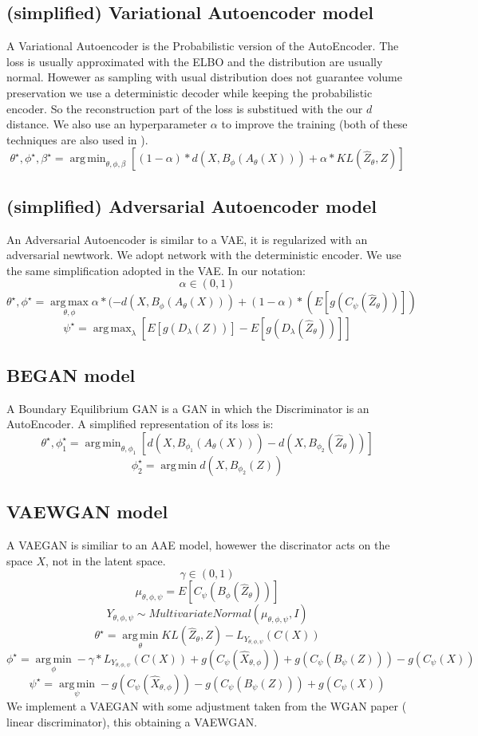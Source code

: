 \documentclass{article}
\DeclareMathOperator*{\argmax}{arg\,max}
\DeclareMathOperator*{\argmin}{arg\,min}
\begin{document}
\subsection{(simplified) Variational Autoencoder model}
A Variational Autoencoder \cite{varauto} is the Probabilistic version of the  AutoEncoder. The loss is usually approximated with the ELBO and the distribution are usually normal. Howewer as sampling with usual distribution does not guarantee volume preservation we use a deterministic decoder while keeping the probabilistic encoder.  So the reconstruction part of the loss is substitued with the our $d$ distance. We also use an hyperparameter $\alpha$ to improve the training (both of these techniques are also used in \cite{qtan}).
$$\theta^{\star},\phi^{\star},\beta^{\star}=\argmin_{\theta,\phi,\beta}[(1-\alpha)*d(X,B_{\phi}(A_{\theta}(X)))+\alpha* KL(\hat{Z}_{\theta},Z)]$$



\subsection{(simplified) Adversarial Autoencoder model}
An Adversarial Autoencoder \cite{aae} is similar to a VAE, it is regularized with an adversarial newtwork. We adopt network with the deterministic encoder. We use the same simplification adopted in the VAE. In our notation:
$$\alpha\in (0,1)$$
$$\theta^{\star},\phi^{\star}=\argmax\limits_{\theta,\phi}\alpha*(-d(X,B_{\phi}(A_{\theta}(X)))+(1-\alpha)*(E[g(C_{\psi}(\hat{Z}_{\theta}))])$$
$$\psi^{\star}=\argmax_{\lambda}  [E[g(D_{\lambda}(Z))]-E[g(D_{\lambda}(\hat{Z}_{\theta}))]]
$$


\subsection{BEGAN model}
A Boundary Equilibrium GAN \cite{began} is a GAN in which the Discriminator is an AutoEncoder. A simplified representation of its loss is:
$$\theta^{\star},\phi_{1}^{\star}=\argmin_{\theta,\phi_{1}}[ d(X,B_{\phi_{1}}(A_{\theta}(X)))-d(X,B_{\phi_{2}}(\hat{Z}_{\theta}))]$$
$$\phi_{2}^{\star}=\argmin d(X,B_{\phi_{2}}(Z))$$
\subsection{VAEWGAN model}
A VAEGAN \cite{vaegan} is similiar to an AAE model, howewer the discrinator acts on the space $X$, not in the latent space.
$$\gamma \in (0,1)$$
$$\mu_{\theta,\phi,\psi}=E[C_{\psi}(B_{\phi}(\hat{Z}_{\theta}))]$$
$$Y_{\theta,\phi,\psi}\sim MultivariateNormal(\mu_{\theta,\phi,\psi},I)$$
$$\theta^{\star}=\argmin\limits_{\theta} KL(\hat{Z}_{\theta},Z)-L_{Y_{\theta,\phi,\psi}}(C(X))$$
$$\phi^{\star}= \argmin\limits_{\phi} -\gamma*L_{Y_{\theta,\phi,\psi}}(C(X))+g(C_{\psi}(\hat{X}_{\theta,\phi}))+g(C_{\psi}(B_{\psi}(Z)))-g(C_{\psi}(X))$$
$$\psi^{\star}=\argmin\limits_{\psi}- g(C_{\psi}(\hat{X}_{\theta,\phi}))-g(C_{\psi}(B_{\psi}(Z)))+g(C_{\psi}(X))$$
We implement a VAEGAN with some adjustment taken from the WGAN paper\cite{wgan} ( linear discriminator), this obtaining a VAEWGAN.  
\end{document}

